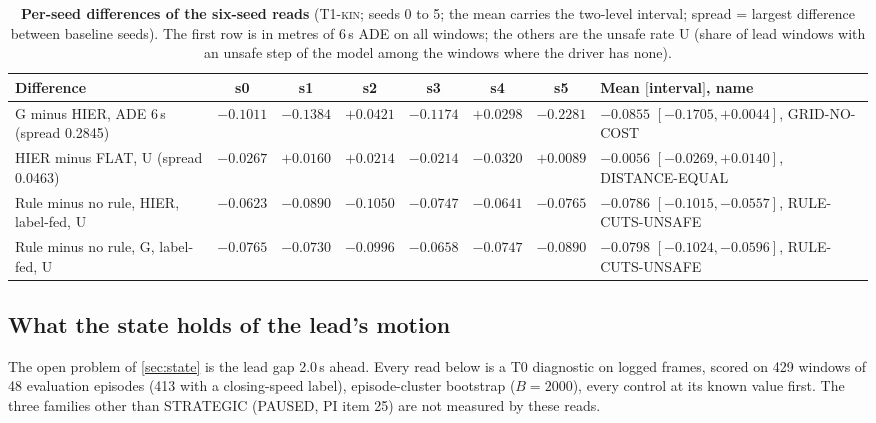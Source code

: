 \documentclass[10pt,twocolumn]{article}
\theoremstyle{remark}
\newcommand{\tier}[1]{\textsc{\small #1}}
\begin{document}
\begin{table}[!tp]
\centering
\caption{\textbf{Per-seed differences of the six-seed reads} (\tier{T1-kin}; seeds 0 to 5; the mean carries the two-level interval; spread = largest difference between baseline seeds). The first row is in metres of 6\,s ADE on all windows; the others are the unsafe rate U (share of lead windows with an unsafe step of the model among the windows where the driver has none).}
\label{tab:perseed}
\scriptsize
\begin{tabularx}{\textwidth}{@{}>{\raggedright\arraybackslash}p{36mm}cccccc>{\raggedright\arraybackslash}X@{}}
\toprule
Difference & s0 & s1 & s2 & s3 & s4 & s5 & Mean $[$interval$]$, name \\
\midrule
G minus HIER, ADE 6\,s (spread 0.2845) & $-0.1011$ & $-0.1384$ & $+0.0421$ & $-0.1174$ & $+0.0298$ & $-0.2281$ & $-0.0855$ $[-0.1705,+0.0044]$, GRID-NO-COST \\
HIER minus FLAT, U (spread 0.0463) & $-0.0267$ & $+0.0160$ & $+0.0214$ & $-0.0214$ & $-0.0320$ & $+0.0089$ & $-0.0056$ $[-0.0269,+0.0140]$, DISTANCE-EQUAL \\
Rule minus no rule, HIER, label-fed, U & $-0.0623$ & $-0.0890$ & $-0.1050$ & $-0.0747$ & $-0.0641$ & $-0.0765$ & $-0.0786$ $[-0.1015,-0.0557]$, RULE-CUTS-UNSAFE \\
Rule minus no rule, G, label-fed, U & $-0.0765$ & $-0.0730$ & $-0.0996$ & $-0.0658$ & $-0.0747$ & $-0.0890$ & $-0.0798$ $[-0.1024,-0.0596]$, RULE-CUTS-UNSAFE \\
\bottomrule
\end{tabularx}
\end{table}

\subsection{What the state holds of the lead's motion}\label{sec:lead}
The open problem of \cref{sec:state} is the lead gap 2.0\,s ahead. Every read below is a \tier{T0} diagnostic on logged frames, scored on 429 windows of 48 evaluation episodes (413 with a closing-speed label), episode-cluster bootstrap ($B=2000$), every control at its known value first. The three families other than STRATEGIC (PAUSED, PI item 25) are not measured by these reads.
\end{document}
